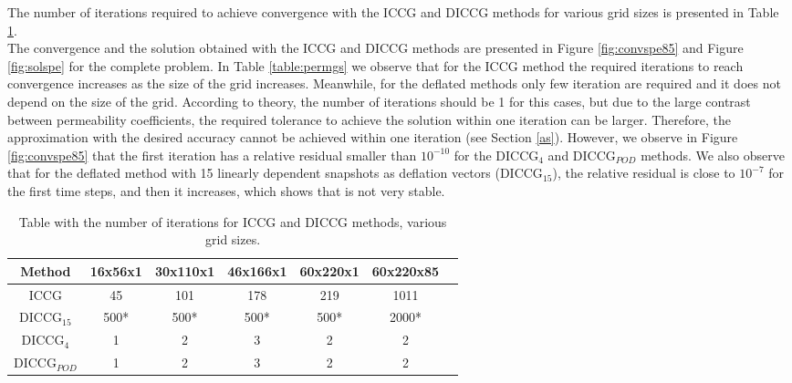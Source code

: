 \documentclass[12pt]{article}
\numberwithin{equation}{section}
\begin{document}
The number of iterations required to achieve convergence with the ICCG and DICCG methods for various
grid sizes is presented in Table \ref{table:itgrid}. \\
The convergence and the solution obtained with the ICCG and DICCG methods are presented in Figure \ref{fig:convspe85} and Figure \ref{fig:solspe} for the complete problem. 
In Table \ref{table:permgs} we observe that for the ICCG method the required iterations to reach convergence increases as the size of the grid increases. Meanwhile, for the deflated methods only few iteration are required and it does not depend on the size of the grid. According to theory, the number of iterations should be 1 for this cases, but due to the large contrast between permeability coefficients, the required tolerance to achieve the solution within one iteration can be larger. Therefore, the approximation with the desired accuracy cannot be achieved within one iteration (see Section \ref{as}). However, we observe in Figure \ref{fig:convspe85} that the first iteration has a relative residual smaller than $10^{-10}$ for the DICCG$_4$ and DICCG$_{POD}$ methods.
We also observe that for the deflated method with 15 linearly dependent snapshots as deflation vectors (DICCG$_{15}$), the relative residual is close to $10^{-7}$ for the first time steps, and then it increases, which shows that is not very stable. 

\begin{table}[!ht]
\centering
\begin{tabular}{|c |c|c|c|c|c| c| } 
 \hline
Method  & 16x56x1& 30x110x1& 46x166x1& 60x220x1&60x220x85\\
   \hline
  ICCG & 45 & 101&  178 &  219&1011 \\ 
   DICCG$_{15}$ & 500* & 500*&  500* &  500*& 2000*\\ 
   DICCG$_{4}$ & 1 & 2&  3 &  2& 2\\  
   DICCG$_{POD}$ & 1 & 2&  3 &  2 &2\\ 
\hline
\end{tabular}
\caption{Table with the number of iterations for ICCG and DICCG methods, 
various grid sizes.}
\label{table:itgrid}
\end{table}
\end{document}
